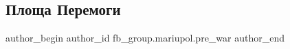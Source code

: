 
 
 
 
 

\subsection{Площа Перемоги}
\label{sec:07_02_2023.fb.fb_group.mariupol.pre_war.4.ploshcha_peremogi}

\ifcmt
 author_begin
   author_id fb_group.mariupol.pre_war
 author_end
\fi
